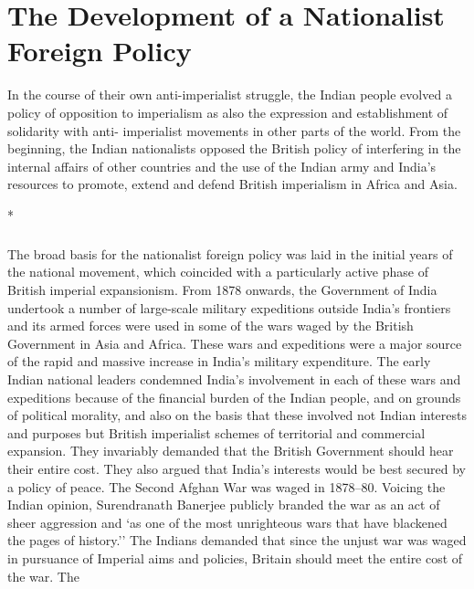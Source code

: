 
\chapter{The Development of a Nationalist Foreign Policy}

In the course of their own anti-imperialist struggle, the Indian people evolved a policy of opposition to imperialism as also the expression and establishment of solidarity with anti- imperialist movements in other parts of the world. From the beginning, the Indian nationalists opposed the British policy of interfering in the internal affairs of other countries and the use of the Indian army and India's resources to promote, extend and defend British imperialism in Africa and Asia.

\begin{center}*\end{center}

\paragraph*{}

The broad basis for the nationalist foreign policy was laid in the initial years of the national movement, which coincided with a particularly active phase of British imperial expansionism. From 1878 onwards, the Government of India undertook a number of large-scale military expeditions outside India's frontiers and its armed forces were used in some of the wars waged by the British Government in Asia and Africa. These wars and expeditions were a major source of the rapid and massive increase in India's military expenditure. The early Indian national leaders condemned India's involvement in each of these wars and expeditions because of the financial burden of the Indian people, and on grounds of political morality, and also on the basis that these involved not Indian interests and purposes but British imperialist schemes of territorial and commercial expansion. They invariably demanded that the British Government should hear their entire cost. They also argued that India's interests would be best secured by a policy of peace. The Second Afghan War was waged in 1878--80. Voicing the Indian opinion, Surendranath Banerjee publicly branded the war as an act of sheer aggression and `as one of the most unrighteous wars that have blackened the pages of history.'' The Indians demanded that since the unjust war was waged in pursuance of Imperial aims and policies, Britain should meet the entire cost of the war. The 


